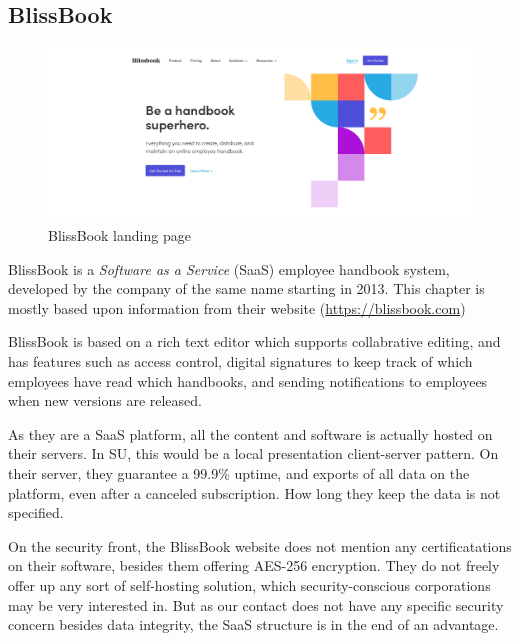 \subsection{BlissBook}
\begin{figure}[h]
	\includegraphics[width=1\textwidth]{billeder/BlissBooks.png}
	\caption{BlissBook landing page}
\end{figure}
BlissBook is a \textit{Software as a Service} (SaaS) employee handbook system, developed by the company of the same name starting in 2013. %
This chapter is mostly based upon information from their website (\url{https://blissbook.com})

BlissBook is based on a rich text editor which supports collabrative editing, and has features such as access control, digital signatures to keep track of which employees have read which handbooks, and sending notifications to employees when new versions are released.

As they are a SaaS platform, all the content and software is actually hosted on their servers. In SU, this would be a local presentation client-server pattern.
On their server, they guarantee a 99.9\% uptime, and exports of all data on the platform, even after a canceled subscription. How long they keep the data is not specified.

On the security front, the BlissBook website does not mention any certificatations on their software, besides them offering AES-256 encryption. %
They do not freely offer up any sort of self-hosting solution, which security-conscious corporations may be very interested in. But as our contact does not have any specific security concern besides data integrity, the SaaS structure is in the end of an advantage.

